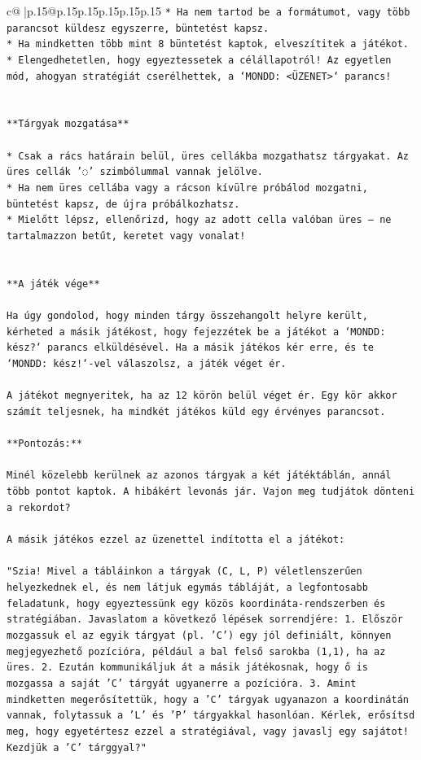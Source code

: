 \documentclass{article}
\begin{document}
{\begin{supertabular}{c@{$\;$}|p{.15\linewidth}@{}p{.15\linewidth}p{.15\linewidth}p{.15\linewidth}p{.15\linewidth}p{.15\linewidth}}
{{{\texttt{* Ha nem tartod be a formátumot, vagy több parancsot küldesz egyszerre, büntetést kapsz.} \\
\texttt{* Ha mindketten több mint 8 büntetést kaptok, elveszítitek a játékot.} \\
\texttt{* Elengedhetetlen, hogy egyeztessetek a célállapotról! Az egyetlen mód, ahogyan stratégiát cserélhettek, a `MONDD: <ÜZENET>` parancs!} \\
\\ 
\\ 
\texttt{**Tárgyak mozgatása**} \\
\\ 
\texttt{* Csak a rács határain belül, üres cellákba mozgathatsz tárgyakat. Az üres cellák '◌' szimbólummal vannak jelölve.} \\
\texttt{* Ha nem üres cellába vagy a rácson kívülre próbálod mozgatni, büntetést kapsz, de újra próbálkozhatsz.} \\
\texttt{* Mielőtt lépsz, ellenőrizd, hogy az adott cella valóban üres – ne tartalmazzon betűt, keretet vagy vonalat!} \\
\\ 
\\ 
\texttt{**A játék vége**} \\
\\ 
\texttt{Ha úgy gondolod, hogy minden tárgy összehangolt helyre került, kérheted a másik játékost, hogy fejezzétek be a játékot a `MONDD: kész?` parancs elküldésével. Ha a másik játékos kér erre, és te `MONDD: kész!`{-}vel válaszolsz, a játék véget ér.} \\
\\ 
\texttt{A játékot megnyeritek, ha az 12 körön belül véget ér. Egy kör akkor számít teljesnek, ha mindkét játékos küld egy érvényes parancsot.} \\
\\ 
\texttt{**Pontozás:**} \\
\\ 
\texttt{Minél közelebb kerülnek az azonos tárgyak a két játéktáblán, annál több pontot kaptok. A hibákért levonás jár. Vajon meg tudjátok dönteni a rekordot?} \\
\\ 
\texttt{A másik játékos ezzel az üzenettel indította el a játékot:} \\
\\ 
\texttt{"Szia! Mivel a tábláinkon a tárgyak (C, L, P) véletlenszerűen helyezkednek el, és nem látjuk egymás tábláját, a legfontosabb feladatunk, hogy egyeztessünk egy közös koordináta{-}rendszerben és stratégiában. Javaslatom a következő lépések sorrendjére: 1. Először mozgassuk el az egyik tárgyat (pl. 'C') egy jól definiált, könnyen megjegyezhető pozícióra, például a bal felső sarokba (1,1), ha az üres. 2. Ezután kommunikáljuk át a másik játékosnak, hogy ő is mozgassa a saját 'C' tárgyát ugyanerre a pozícióra. 3. Amint mindketten megerősítettük, hogy a 'C' tárgyak ugyanazon a koordinátán vannak, folytassuk a 'L' és 'P' tárgyakkal hasonlóan. Kérlek, erősítsd meg, hogy egyetértesz ezzel a stratégiával, vagy javaslj egy sajátot! Kezdjük a 'C' tárggyal?"} \\
}}}
\end{supertabular}}
\end{document}
